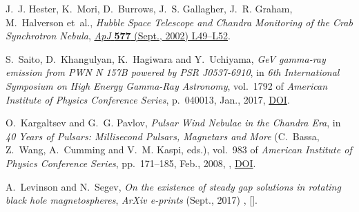 \documentclass{PoS}
\newcommand{\apjl}{ApJ}
\begin{document}
\begin{thebibliography}{10}
J.~J. {Hester}, K.~{Mori}, D.~{Burrows}, J.~S. {Gallagher}, J.~R. {Graham},
  M.~{Halverson} et~al., \emph{{Hubble Space Telescope and Chandra Monitoring
  of the Crab Synchrotron Nebula}},
  \href{https://doi.org/10.1086/344132}{\emph{\apjl} {\bfseries 577} (Sept.,
  2002) L49--L52}.

S.~{Saito}, D.~{Khangulyan}, K.~{Hagiwara} and Y.~{Uchiyama}, \emph{{GeV
  gamma-ray emission from PWN N 157B powered by PSR J0537-6910}},  in \emph{6th
  International Symposium on High Energy Gamma-Ray Astronomy}, vol.~1792 of
  \emph{American Institute of Physics Conference Series}, p.~040013, Jan.,
  2017, \href{https://doi.org/10.1063/1.4968917}{DOI}.

O.~{Kargaltsev} and G.~G. {Pavlov}, \emph{{Pulsar Wind Nebulae in the Chandra
  Era}},  in \emph{40 Years of Pulsars: Millisecond Pulsars, Magnetars and
  More} (C.~{Bassa}, Z.~{Wang}, A.~{Cumming} and V.~M. {Kaspi}, eds.), vol.~983
  of \emph{American Institute of Physics Conference Series}, pp.~171--185,
  Feb., 2008, \href{https://arxiv.org/abs/0801.2602}{{}},
  \href{https://doi.org/10.1063/1.2900138}{DOI}.

A.~{Levinson} and N.~{Segev}, \emph{{On the existence of steady gap solutions
  in rotating black hole magnetospheres}}, {\emph{ArXiv e-prints} (Sept., 2017)
  }, [\href{https://arxiv.org/abs/1709.09397}{{}}].

\end{thebibliography}\endgroup
\end{document}
